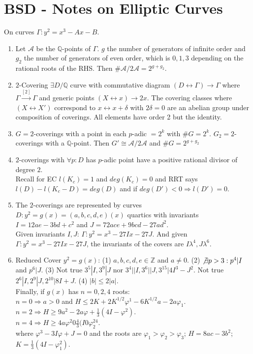 \documentclass{article}
\newcommand{\Q}{\mathbb{Q}}
\newcommand{\Z}{\mathbb{Z}}
\newcommand{\ra}{\rightarrow}
\newcommand{\Ra}{\Rightarrow}
\newcommand{\lra}{\leftrightarrow}
\newcommand{\raa}[1]{\overset{#1}{\longrightarrow}}
\begin{document}
\section{BSD - Notes on Elliptic Curves}
\begin{multicols}{2}
On curves $\Gamma: y^2 = x^3 - Ax - B$.
\begin{enumerate}
\item Let $\mathcal{A}$ be the $\Q$-points of $\Gamma$. $g$ the number of generators of infinite order and $g_2$ the number of generators of even order, which is $0,1,3$ depending on the rational roots of the RHS. Then $\#\mathcal{A}/2\mathcal{A} = 2^{g + g_2}$. 


\item $2$-Covering $\exists D/\Q$ curve with commutative diagram $(D \lra \Gamma) \ra \Gamma$ where $\Gamma \raa{[2]} \Gamma$ and generic points $(X \lra x) \ra 2x$. The covering classes where $(X \lra X')$ correspond to $x \lra x + \delta$ with $2\delta = 0$ are an abelian group under composition of coverings. All elements have order 2 but the identity.

\item $G = 2$-coverings with a point in each $p$-adic $= 2^k$ with $\#G = 2^k$. $G_2 = 2$-coverings with a $\Q$-point. Then $G' \cong \mathcal{A}/2\mathcal{A}$ and $\#G = 2^{g + g_2}$

\item $2$-coverings with $\forall p: D$ has $p$-adic point have a positive rational divisor of degree $2$.\\
Recall for EC $l(K_c) = 1$ and $deg(K_c) = 0$ and RRT says $l(D) - l(K_c-D) = deg(D)$ and if $deg(D') < 0 \Ra l(D') = 0$.

\item The $2$-coverings are represented by curves $D: y^2 = g(x) = (a,b,c,d,e)(x)$ quartics with invariants $I = 12ae - 3bd + c^2$ and $J = 72 ace + 9bcd - 27ad^2$. \\

Given invariants $I,J$:  $\Gamma: y^2 = x^3 - 27Ix - 27J$. And given $\Gamma: y^2 = x^3 - 27Ix - 27J$, the invariants of the covers are $I\lambda^4, J \lambda^6$. 


\item Reduced Cover $y^2 = g(x)$: (1) $a,b,c,d,e \in \Z$ and $a \neq 0$. (2) $\not \exists p > 3: p^4|I$ and $p^6|J$. (3) Not true $3^5|I, 3^9|J$ nor $3^4||I, 3^6||J, 3^{15}|4I^3 - J^2$. Not true $2^6|I, 2^9|J, 2^{10}|8I+J$. (4) $|b| \leq 2|a|$. \\
Finally, if $g(x)$ has $n = 0,2,4$ roots:\\
$n = 0 \Ra a > 0$ and $H \leq 2K + 2K^{1/2}\varphi^1 - 6K^{1/2}a - 2a\varphi_1$. \\
$n = 2 \Ra H \geq 9a^2 - 2a\varphi + \frac{1}{3}(4I - \varphi^2)$.\\
$n = 4 \Ra H \geq 4a\varphi^2 0 \frac{4}{3}(I 0 \varphi_2^24$. \\
where $\varphi^3 - 3I\varphi + J = 0$ and the roots are $\varphi_1 > \varphi_2 > \varphi_3$; $H = 8ac - 3b^2$; $K = \frac{1}{3}(4I - \varphi_1^2)$. 


\end{enumerate}
\end{multicols}
\end{document}
